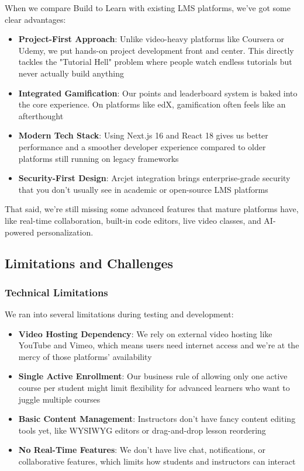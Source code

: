 \documentclass[final,3p,times,twocolumn]{elsarticle}
\begin{document}
When we compare Build to Learn with existing LMS platforms, we've got some clear advantages:

\begin{itemize}
    \item \textbf{Project-First Approach}: Unlike video-heavy platforms like Coursera or Udemy, we put hands-on project development front and center. This directly tackles the "Tutorial Hell" problem where people watch endless tutorials but never actually build anything
    \item \textbf{Integrated Gamification}: Our points and leaderboard system is baked into the core experience. On platforms like edX, gamification often feels like an afterthought
    \item \textbf{Modern Tech Stack}: Using Next.js 16 and React 18 gives us better performance and a smoother developer experience compared to older platforms still running on legacy frameworks
    \item \textbf{Security-First Design}: Arcjet integration brings enterprise-grade security that you don't usually see in academic or open-source LMS platforms
\end{itemize}

That said, we're still missing some advanced features that mature platforms have, like real-time collaboration, built-in code editors, live video classes, and AI-powered personalization.

\subsection{Limitations and Challenges}

\subsubsection{Technical Limitations}

We ran into several limitations during testing and development:

\begin{itemize}
    \item \textbf{Video Hosting Dependency}: We rely on external video hosting like YouTube and Vimeo, which means users need internet access and we're at the mercy of those platforms' availability
    \item \textbf{Single Active Enrollment}: Our business rule of allowing only one active course per student might limit flexibility for advanced learners who want to juggle multiple courses
    \item \textbf{Basic Content Management}: Instructors don't have fancy content editing tools yet, like WYSIWYG editors or drag-and-drop lesson reordering
    \item \textbf{No Real-Time Features}: We don't have live chat, notifications, or collaborative features, which limits how students and instructors can interact
\end{itemize}
\end{document}

